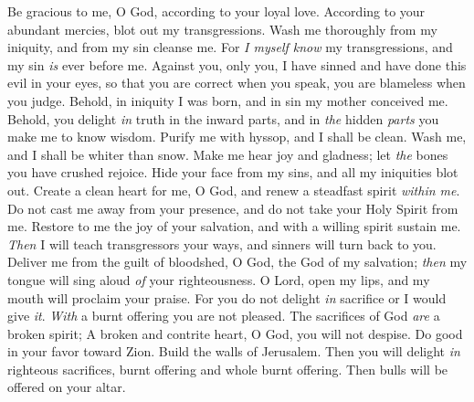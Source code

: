 \begin{biblechapter} %
 Be gracious to me, O God, according to your loyal love. 
According to your abundant mercies, 
blot out my transgressions.
\verse Wash me thoroughly from my iniquity, 
and from my sin cleanse me.
\verse For \textit{I myself know} my transgressions, 
and my sin \textit{is} ever before me.
\verse Against you, only you, I have sinned 
and have done this evil in your eyes, 
so that you are correct when you speak, 
you are blameless when you judge.
\verse Behold, in iniquity I was born, 
and in sin my mother conceived me.
\verse Behold, you delight \textit{in} truth in the inward parts, 
and in \textit{the} hidden \textit{parts} you make me to know wisdom.
\verse Purify me with hyssop, and I shall be clean. 
Wash me, and I shall be whiter than snow.
\verse Make me hear joy and gladness; 
let \textit{the} bones you have crushed rejoice.
\verse Hide your face from my sins, 
and all my iniquities blot out.
\verse Create a clean heart for me, O God, 
and renew a steadfast spirit \textit{within me}.
\verse Do not cast me away from your presence, 
and do not take your Holy Spirit from me.
\verse Restore to me the joy of your salvation, 
and with a willing spirit sustain me.
\verse \textit{Then} I will teach transgressors your ways, 
and sinners will turn back to you.
\verse Deliver me from the guilt of bloodshed, O God, 
the God of my salvation; 
\textit{then} my tongue will sing aloud \textit{of} your righteousness.
\verse O Lord, open my lips, 
and my mouth will proclaim your praise.
\verse For you do not delight \textit{in} sacrifice or I would give \textit{it}. 
\textit{With} a burnt offering you are not pleased.
\verse The sacrifices of God \textit{are} a broken spirit; 
A broken and contrite heart, 
O God, you will not despise.
\verse Do good in your favor toward Zion. 
Build the walls of Jerusalem.
\verse Then you will delight \textit{in} righteous sacrifices, 
burnt offering and whole burnt offering. 
Then bulls will be offered on your altar.
\end{biblechapter}

